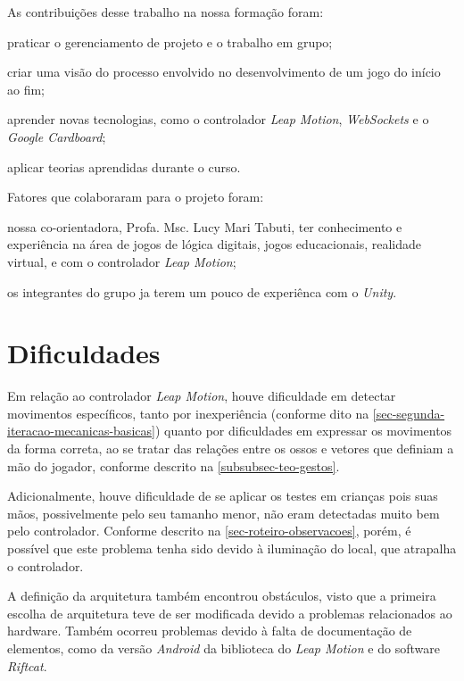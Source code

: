 As contribuições desse trabalho na nossa formação foram:

\begin{alineas}
	\item praticar o gerenciamento de projeto e o trabalho em grupo;
	\item criar uma visão do processo envolvido no desenvolvimento de um jogo do início ao fim;
	\item aprender novas tecnologias, como o controlador \textit{Leap Motion}, \textit{WebSockets} e o \textit{Google Cardboard};
	\item aplicar teorias aprendidas durante o curso.
\end{alineas}

Fatores que colaboraram para o projeto foram:

\begin{alineas}
	\item nossa co-orientadora, Profa. Msc. Lucy Mari Tabuti, ter conhecimento e experiência na área de jogos de lógica digitais, jogos educacionais, realidade virtual, e com o controlador \textit{Leap Motion};
	\item os integrantes do grupo ja terem um pouco de experiênca com o \textit{Unity}.
\end{alineas}

\section{Dificuldades}\label{sec-conc-dificuldades}

Em relação ao controlador \textit{Leap Motion}, houve dificuldade em detectar
movimentos específicos, tanto por inexperiência (conforme dito na
\autoref{sec-segunda-iteracao-mecanicas-basicas}) quanto por dificuldades 
em expressar os movimentos da forma correta, ao se tratar das relações entre 
os ossos e vetores que definiam a mão do jogador, conforme descrito na
\autoref{subsubsec-teo-gestos}.

Adicionalmente, houve dificuldade de se aplicar os testes em crianças pois
suas mãos, possivelmente pelo seu tamanho menor, não eram detectadas muito 
bem pelo controlador. Conforme descrito na 
\autoref{sec-roteiro-observacoes}, porém, é possível que este problema 
tenha sido devido à iluminação do local, que atrapalha o controlador.

A definição da arquitetura também encontrou obstáculos, visto que a 
primeira escolha de arquitetura teve de ser modificada devido 
a problemas relacionados ao hardware. Também ocorreu problemas devido à falta de documentação de elementos, como da versão \textit{Android} da biblioteca do \textit{Leap Motion} e do software \textit{Riftcat}.

